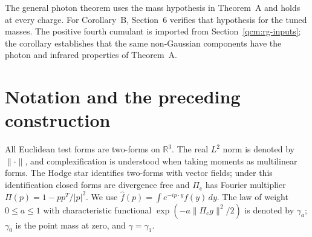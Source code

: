 \documentclass[11pt,letterpaper,reqno]{amsart}
\theoremstyle{definition}
\begin{document}
The general photon theorem uses the mass hypothesis in Theorem~A and
holds at every charge. For Corollary~B, Section~6 verifies that
hypothesis for the tuned masses. The positive fourth cumulant is
imported from Section~\ref{qcm:rg-inputs}; the corollary establishes that
the same non-Gaussian components have the photon and infrared
properties of Theorem~A.

\section*{Notation and the preceding construction}\label{qcm:notation}
All Euclidean test forms are two-forms on $\mathbb R^3$.
The real $L^2$ norm is denoted by $\|\cdot\|$, and complexification is
understood when taking moments as multilinear forms.
The Hodge star identifies two-forms with vector fields; under this
identification closed forms are divergence free and
$\Pi_{\mathrm c}$ has Fourier multiplier $\Pi(p)=1-pp^T/|p|^2$.
We use $\hat f(p)=\int e^{-ip\cdot y}f(y)\,dy$.
The law of weight $0\le a\le1$ with characteristic functional
$\exp(-a\|\Pi_{\mathrm c}g\|^2/2)$ is denoted by $\gamma_a$;
$\gamma_0$ is the point mass at zero, and $\gamma=\gamma_1$.
\end{document}

